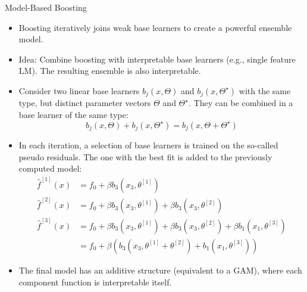 \documentclass[11pt,compress,t,notes=noshow, aspectratio=169, xcolor=table]{beamer}
\begin{document}
\begin{vbframe}{Model-Based Boosting}

\begin{itemize}
\setlength\itemsep{2em}
\item 
Boosting iteratively joins weak base learners to create a powerful ensemble model.
\item 
Idea: Combine boosting with interpretable base learners (e.g., single feature LM). The resulting ensemble is also interpretable.
\item
Consider two linear base learners $b_j(x, \Theta)$ and $b_j(x, \Theta^{\star})$ with the same type, but distinct parameter vectors $\Theta$ and $\Theta^{\star}$. They can be combined in a base learner of the same type:
$$
b_j(x, \Theta) + b_j(x, \Theta^{\star}) = b_j(x, \Theta + \Theta^{\star})
$$
\item In each iteration, a selection of base learners is trained on the so-called pseudo residuals. The one with the best fit is added to the previously computed model:
\medskip
\begin{align*}
\widehat{f}^{[1]}(x) &= f_0 + \beta b_3(x_3, \theta^{[1]}) \\
\widehat{f}^{[2]}(x) &= f_0 + \beta b_3(x_3, \theta^{[1]}) + \beta b_3(x_3, \theta^{[2]})\\
\widehat{f}^{[3]}(x) &= f_0 + \beta b_3(x_3, \theta^{[1]}) + \beta b_3(x_3, \theta^{[2]}) + \beta b_1(x_1, \theta^{[3]}) \\
&= f_0 + \beta \left(b_3(x_3, \theta^{[1]} + \theta^{[2]}) + b_1(x_1, \theta^{[3]})\right)
\end{align*}

\item The final model has an additive structure (equivalent to a GAM), where each component function is interpretable itself.

\end{itemize}
\end{vbframe}





\end{document}
